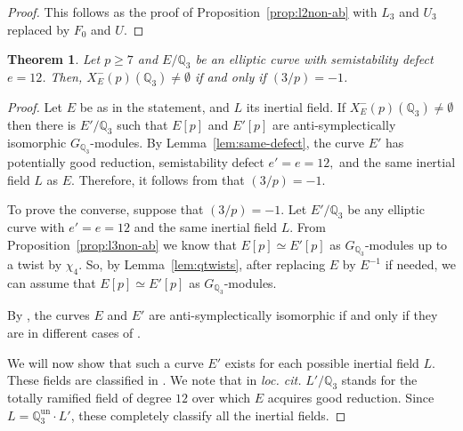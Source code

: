 \documentclass[12pt]{amsart}
\numberwithin{equation}{section}
\newtheorem{theorem}[equation]{Theorem}
\theoremstyle{definition}
\newcommand{\Q}{\mathbb{Q}}
\newcommand{\Xp}{X_E^{-}(p)}
\begin{document}
\begin{proof}
This follows as the proof of Proposition~\ref{prop:l2non-ab} with $L_3$ and $U_3$ replaced by $F_0$ and $U$.
\end{proof}
\begin{theorem}\label{thm:l3n-abinertia}
    Let $p\geq 7$ and $E/\Q_3$ be an elliptic curve with 
    semistability defect $e=12$. Then, $\Xp(\Q_3)\neq \emptyset$ if and only if $(3/p)=-1$.
\end{theorem}
\begin{proof}
Let $E$ be as in the statement, and $L$ its inertial field.
If $\Xp(\Q_3)\neq \emptyset$ then there is $E'/\Q_3$ such that
$E[p]$ and $E'[p]$ are anti-symplectically isomorphic $G_{\Q_3}$-modules. By Lemma~\ref{lem:same-defect}, the curve $E'$ has potentially good
reduction, semistability defect $e'=e=12,$
and the same inertial field $L$ as $E$.
Therefore, it follows from \cite[Theorem 10]{symplectic} that $(3/p)=-1$.

To prove the converse, suppose that $(3/p)= -1$.
Let $E'/\Q_3$ be any elliptic curve with $e'=e=12$ and the same inertial field $L$. From Proposition~\ref{prop:l3non-ab} we know that $E[p] \simeq E'[p]$ as $G_{\Q_3}$-modules up to a twist by $\chi_4$. So, by Lemma~\ref{lem:qtwists}, after replacing $E$ by $E^{-1}$ if needed, we can assume that $E[p] \simeq E'[p]$ as $G_{\Q_3}$-modules. 

By \cite[Theorem 11]{symplectic}, the curves $E$ and $E'$ are anti-symplectically isomorphic if and only if they are in different cases of \cite[Table 4]{symplectic}.

We will now show that such a curve $E'$ exists for each possible inertial field $L$. These fields are classified in \cite[Table 4]{inertial}. We note that in {\it{loc. cit.}} $L'/\Q_3$ stands for the totally ramified field of degree $12$ over which $E$ acquires good reduction. Since $L=\Q_3^{\text{un}} \cdot L'$, these completely classify all the inertial fields.


\end{proof}
\end{document}
